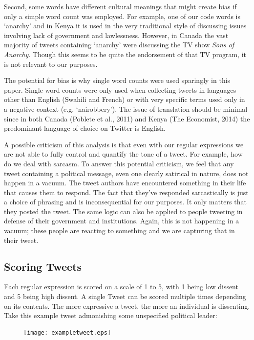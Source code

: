 \documentclass[12pt]{article}
\begin{document}
\begin{spacing}{1.5}
Second, some words have different cultural meanings that might create bias if only a simple word count was employed. For example, one of our code words is `anarchy' and in Kenya it is used in the very traditional style of discussing issues involving lack of government and lawlessness. However, in Canada the vast majority of tweets containing `anarchy' were discussing the TV show \textit{Sons of Anarchy}. Though this seems to be quite the endorsement of that TV program, it is not relevant to our purposes. 

The potential for bias is why single word counts were used sparingly in this paper. Single word counts were only used when collecting tweets in languages other than English (Swahili and French) or with very specific terms used only in a negative context (e.g. `nairobbery'). The issue of translation should be minimal since in both Canada (Poblete et al., 2011) and Kenya (The Economist, 2014) the predominant language of choice on Twitter is English. 

A possible criticism of this analysis is that even with our regular expressions we are not able to fully control and quantify the tone of a tweet. For example, how do we deal with sarcasm. To answer this potential criticism, we feel that any tweet containing a political message, even one clearly satirical in nature, does not happen in a vacuum. The tweet authors have encountered something in their life that causes them to respond. The fact that they've responded sarcastically is just a choice of phrasing and is inconsequential for our purposes. It only matters that they posted the tweet. The same logic can also be applied to people tweeting in defense of their government and institutions. Again, this is not happening in a vacuum; these people are reacting to something and we are capturing that in their tweet.

\subsection*{Scoring Tweets}

Each regular expression is scored on a scale of 1 to 5, with 1 being low dissent and 5 being high dissent. A single Tweet can be scored multiple times depending on its contents. The more expressive a tweet, the more an individual is dissenting. Take this example tweet admonishing some unspecified political leader: 

\vspace{.5 em}

\begin{figure}[htb]
\centering 
\texttt{[image: exampletweet.eps]} 
\end{figure}
     

\end{spacing}
\end{document}
